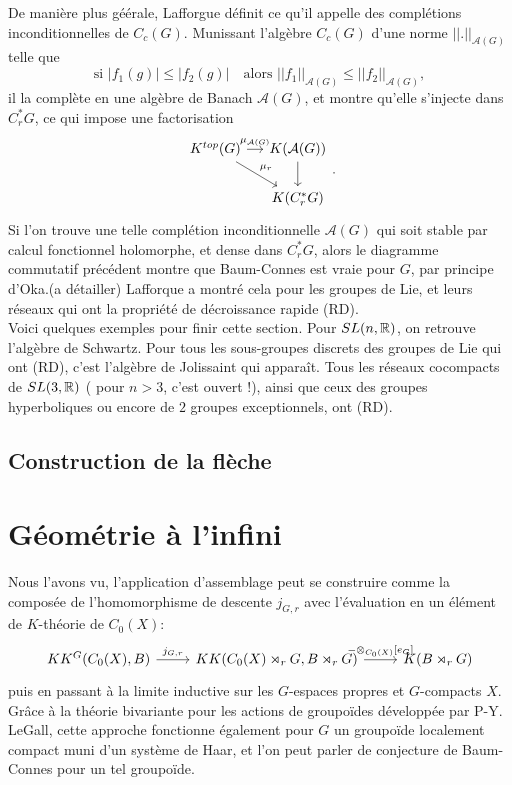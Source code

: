 De manière plus géérale, Lafforgue définit ce qu'il appelle des complétions inconditionnelles de $C_c(G)$. Munissant l'algèbre $C_c(G)$ d'une norme $||.||_{\mathcal A(G)}$ telle que
\[\text{si } |f_1(g)|\leq |f_2(g)|\quad \text{alors } ||f_1||_{\mathcal A(G)}\leq||f_2||_{\mathcal A(G)},\]
il la complète en une algèbre de Banach $\mathcal A(G)$, et montre qu'elle s'injecte dans $C^*_r G$, ce qui impose une factorisation 
\[\begin{tikzcd}[column sep = small]
K^{top}(G) \arrow{r}{\mu_{\mathcal A(G)}}\arrow{dr}{\mu_r} & K(\mathcal A(G)) \arrow{d}\\
					& K(C^*_r G)
\end{tikzcd}.\]
Si l'on trouve une telle complétion inconditionnelle $\mathcal A(G)$ qui soit stable par calcul fonctionnel holomorphe, et dense dans $C^*_r G$, alors le diagramme commutatif précédent montre que Baum-Connes est vraie pour $G$, par principe d'Oka.(a détailler) Lafforque a montré cela pour les groupes de Lie, et leurs réseaux qui ont la propriété de décroissance rapide (RD).\\

Voici quelques exemples pour finir cette section. Pour $SL(n,\mathbb R)$, on retrouve l'algèbre de Schwartz. Pour tous les sous-groupes discrets des groupes de Lie qui ont (RD), c'est l'algèbre de Jolissaint qui apparaît. Tous les réseaux cocompacts de $SL(3,\mathbb R)$ ( pour $n> 3$, c'est ouvert !), ainsi que ceux des groupes hyperboliques ou encore de $2$ groupes exceptionnels, ont (RD).  

\subsection{Construction de la flèche}
\section{Géométrie à l'infini}

Nous l'avons vu, l'application d'assemblage peut se construire comme la composée de l'homomorphisme de descente $j_{G,r}$ avec l'évaluation en un élément de $K$-théorie de $C_0(X)$:
\[\begin{tikzcd}
KK^G(C_0(X),B)\arrow{r}{j_{G,r}}& KK(C_0(X)\rtimes_r G,B \rtimes_r G) \arrow{r}{-\otimes_{C_0(X)} [e_G]} & K(B\rtimes_r G) 
\end{tikzcd}\]
puis en passant à la limite inductive sur les $G$-espaces propres et $G$-compacts $X$. Grâce à la théorie bivariante pour les actions de groupoïdes développée par P-Y. LeGall, cette approche fonctionne également pour $G$ un groupoïde localement compact muni d'un système de Haar, et l'on peut parler de conjecture de Baum-Connes pour un tel groupoïde.  \\


